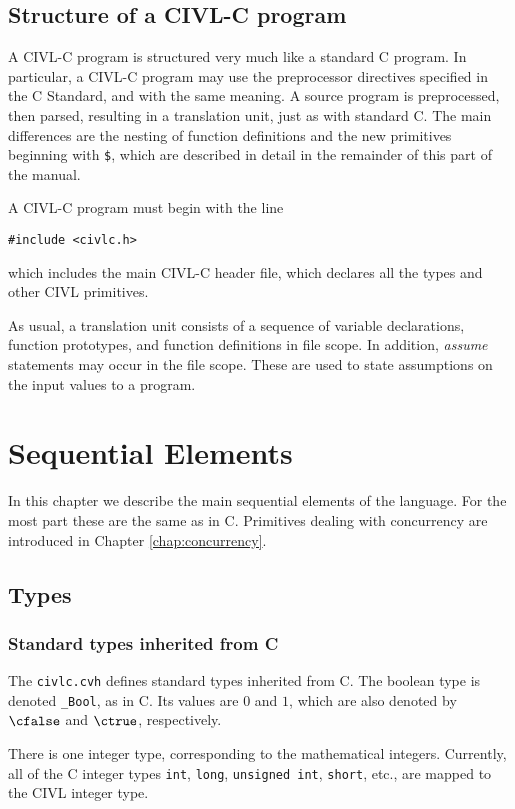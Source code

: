 \section{Structure of a CIVL-C program}

A CIVL-C program is structured very much like a standard C program.
In particular, a CIVL-C program may use the preprocessor directives
specified in the C Standard, and with the same meaning.  A source
program is preprocessed, then parsed, resulting in a translation unit,
just as with standard C.  The main differences are the nesting of
function definitions and the new primitives beginning with
\texttt{\$}, which are described in detail in the remainder of this
part of the manual.

A CIVL-C program must begin with the line
\begin{verbatim}
#include <civlc.h>
\end{verbatim}
which includes the main CIVL-C header file, which declares all the
types and other CIVL primitives.

As usual, a translation unit consists of a sequence of variable
declarations, function prototypes, and function definitions in file
scope.  In addition, \emph{assume} statements may occur in the file
scope.  These are used to state assumptions on the input values
to a program.

\chapter{Sequential Elements}

In this chapter we describe the main sequential elements of the
language.  For the most part these are the same as in C.
Primitives dealing with concurrency are introduced in Chapter
\ref{chap:concurrency}.

\section{Types}

\subsection{Standard types inherited from C}

The \texttt{civlc.cvh} defines standard types inherited from C. 
The boolean type is denoted \verb!_Bool!, as in C. Its values are $0$
and $1$, which are also denoted by $\cfalse$ and $\ctrue$,
respectively.

There is one integer type, corresponding to the mathematical integers.
Currently, all of the C integer types \texttt{int}, \texttt{long},
\texttt{unsigned\ int}, \texttt{short}, etc., are mapped to the CIVL
integer type.

